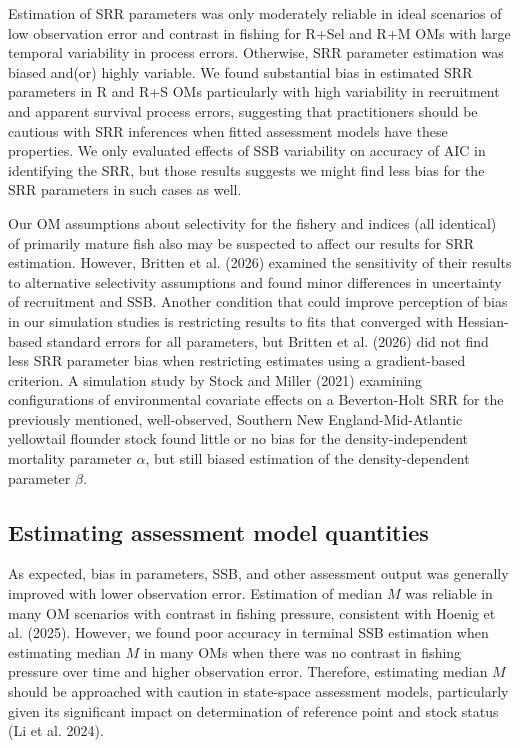 \documentclass[
  12pt,
]{article}
\begin{document}
Estimation of SRR parameters was only moderately reliable in ideal
scenarios of low observation error and contrast in fishing for R+Sel and
R+M OMs with large temporal variability in process errors. Otherwise,
SRR parameter estimation was biased and(or) highly variable. We found
substantial bias in estimated SRR parameters in R and R+S OMs
particularly with high variability in recruitment and apparent survival
process errors, suggesting that practitioners should be cautious with
SRR inferences when fitted assessment models have these properties. We
only evaluated effects of SSB variability on accuracy of AIC in
identifying the SRR, but those results suggests we might find less bias
for the SRR parameters in such cases as well.

Our OM assumptions about selectivity for the fishery and indices (all
identical) of primarily mature fish also may be suspected to affect our
results for SRR estimation. However, Britten et al. (2026) examined the
sensitivity of their results to alternative selectivity assumptions and
found minor differences in uncertainty of recruitment and SSB. Another
condition that could improve perception of bias in our simulation
studies is restricting results to fits that converged with Hessian-based
standard errors for all parameters, but Britten et al. (2026) did not
find less SRR parameter bias when restricting estimates using a
gradient-based criterion. A simulation study by Stock and Miller (2021)
examining configurations of environmental covariate effects on a
Beverton-Holt SRR for the previously mentioned, well-observed, Southern
New England-Mid-Atlantic yellowtail flounder stock found little or no
bias for the density-independent mortality parameter \(\alpha\), but
still biased estimation of the density-dependent parameter \(\beta\).

\subsection*{Estimating assessment model
quantities}\label{estimating-assessment-model-quantities}

As expected, bias in parameters, SSB, and other assessment output was
generally improved with lower observation error. Estimation of median
\(M\) was reliable in many OM scenarios with contrast in fishing
pressure, consistent with Hoenig et al. (2025). However, we found poor
accuracy in terminal SSB estimation when estimating median \(M\) in many
OMs when there was no contrast in fishing pressure over time and higher
observation error. Therefore, estimating median \(M\) should be
approached with caution in state-space assessment models, particularly
given its significant impact on determination of reference point and
stock status (Li et al. 2024).
\end{document}
